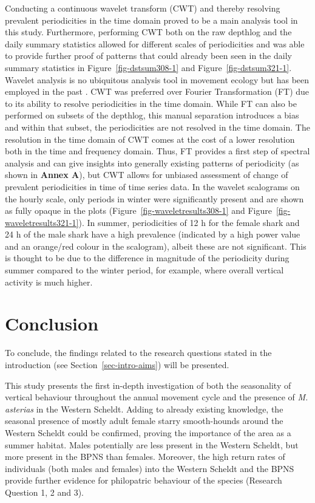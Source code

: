 \documentclass[
  authoryear,
  review,
  3p]{elsarticle}
\begin{document}
Conducting a continuous wavelet transform (CWT) and thereby resolving
prevalent periodicities in the time domain proved to be a main analysis
tool in this study. Furthermore, performing CWT both on the raw depthlog
and the daily summary statistics allowed for different scales of
periodicities and was able to provide further proof of patterns that
could already been seen in the daily summary statistics in
Figure~\ref{fig-dstsum308-1} and Figure~\ref{fig-dstsum321-1}. Wavelet
analysis is no ubiquitous analysis tool in movement ecology but has been
employed in the past \citep{wittemyer_2008, zhang_2020}. CWT was
preferred over Fourier Transformation (FT) due to its ability to resolve
periodicities in the time domain. While FT can also be performed on
subsets of the depthlog, this manual separation introduces a bias and
within that subset, the periodicities are not resolved in the time
domain. The resolution in the time domain of CWT comes at the cost of a
lower resolution both in the time and frequency domain. Thus, FT
provides a first step of spectral analysis and can give insights into
generally existing patterns of periodicity (as shown in \textbf{Annex
A}), but CWT allows for unbiased assessment of change of prevalent
periodicities in time of time series data. In the wavelet scalograms on
the hourly scale, only periods in winter were significantly present and
are shown as fully opaque in the plots
(Figure~\ref{fig-waveletresults308-1} and
Figure~\ref{fig-waveletresults321-1}). In summer, periodicities of 12 h
for the female shark and 24 h of the male shark have a high prevalence
(indicated by a high power value and an orange/red colour in the
scalogram), albeit these are not significant. This is thought to be due
to the difference in magnitude of the periodicity during summer compared
to the winter period, for example, where overall vertical activity is
much higher.

\hypertarget{conclusion}{%
\section{Conclusion}\label{conclusion}}

To conclude, the findings related to the research questions stated in
the introduction (see Section~\ref{sec-intro-aims}) will be presented.

This study presents the first in-depth investigation of both the
seasonality of vertical behaviour throughout the annual movement cycle
and the presence of \emph{M. asterias} in the Western Scheldt. Adding to
already existing knowledge, the seasonal presence of mostly adult female
starry smooth-hounds around the Western Scheldt could be confirmed,
proving the importance of the area as a summer habitat. Males
potentially are less present in the Western Scheldt, but more present in
the BPNS than females. Moreover, the high return rates of individuals
(both males and females) into the Western Scheldt and the BPNS provide
further evidence for philopatric behaviour of the species (Research
Question 1, 2 and 3).
\end{document}
